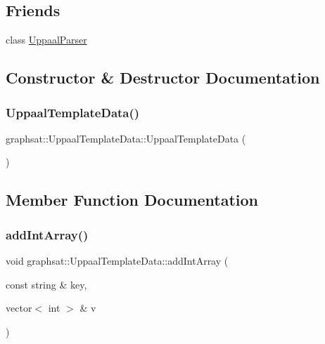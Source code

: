 \subsection*{Friends}
\begin{DoxyCompactItemize}
\item 
class \mbox{\hyperlink{classgraphsat_1_1_uppaal_template_data_a109751399645ae1eb967f5e18e57ee30}{Uppaal\+Parser}}
\end{DoxyCompactItemize}


\subsection{Constructor \& Destructor Documentation}
\mbox{\label{classgraphsat_1_1_uppaal_template_data_ab9a68c1ca51712c5d06bb118cd896fe5}} 
\subsubsection{\texorpdfstring{UppaalTemplateData()}{UppaalTemplateData()}}
{\footnotesize\ttfamily graphsat\+::\+Uppaal\+Template\+Data\+::\+Uppaal\+Template\+Data (\begin{DoxyParamCaption}{ }\end{DoxyParamCaption})\hspace{0.3cm}{\ttfamily [inline]}}



\subsection{Member Function Documentation}
\mbox{\label{classgraphsat_1_1_uppaal_template_data_a109b3e3bd899f1b700cb28253b61f16e}} 
\subsubsection{\texorpdfstring{addIntArray()}{addIntArray()}}
{\footnotesize\ttfamily void graphsat\+::\+Uppaal\+Template\+Data\+::add\+Int\+Array (\begin{DoxyParamCaption}\item[{const string \&}]{key,  }\item[{vector$<$ int $>$ \&}]{v }\end{DoxyParamCaption})\hspace{0.3cm}{\ttfamily [inline]}}

